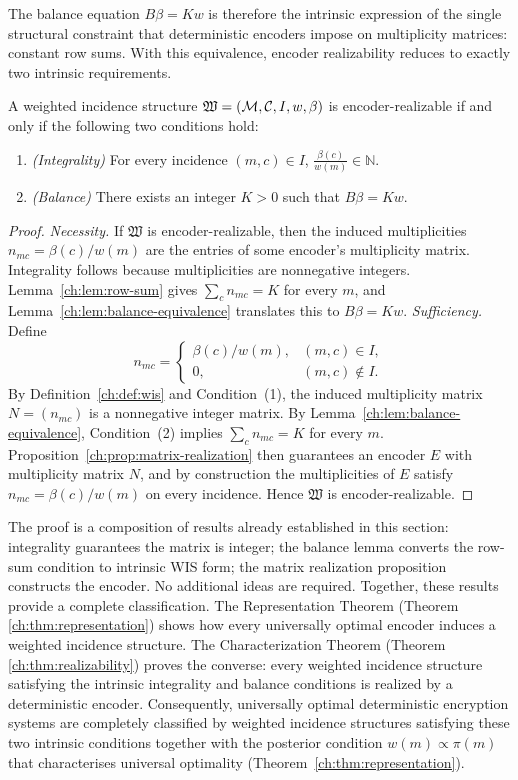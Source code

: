 The balance equation $B\beta=Kw$ is therefore the intrinsic expression
of the single structural constraint that deterministic encoders impose
on multiplicity matrices: constant row sums.  With this equivalence,
encoder realizability reduces to exactly two intrinsic requirements.
\begin{theorem}\label{ch:thm:realizability}
A weighted incidence structure $\mathfrak W=(\mathcal{M},\mathcal{C},I,w,\beta)$ is
encoder-realizable if and only if the following two conditions hold:
\begin{enumerate}
\item \emph{(Integrality)} For every incidence $(m,c)\in I$,
      $\frac{\beta(c)}{w(m)}\in\mathbb N.$
\item \emph{(Balance)} There exists an integer $K>0$ such that
      $B\beta = K w.$
\end{enumerate}
\end{theorem}
\begin{proof}
\emph{Necessity.}  If $\mathfrak W$ is encoder-realizable, then the
induced multiplicities $n_{mc}=\beta(c)/w(m)$ are the entries of some
encoder's multiplicity matrix.  Integrality follows because
multiplicities are nonnegative integers.  Lemma~\ref{ch:lem:row-sum}
gives $\sum_c n_{mc}=K$ for every $m$, and Lemma~\ref{ch:lem:balance-equivalence}
translates this to $B\beta=K w$.
\emph{Sufficiency.}  Define
\[
n_{mc}=
\begin{cases}
\beta(c)/w(m), & (m,c)\in I,\\
0, & (m,c)\notin I.
\end{cases}
\]
By Definition~\ref{ch:def:wis} and Condition~(1), the induced multiplicity
matrix $N=(n_{mc})$ is a nonnegative integer matrix.  By Lemma~\ref{ch:lem:balance-equivalence},
Condition~(2) implies $\sum_c n_{mc}=K$ for every $m$.  Proposition~\ref{ch:prop:matrix-realization}
then guarantees an encoder $E$ with multiplicity matrix $N$, and by
construction the multiplicities of $E$ satisfy $n_{mc}=\beta(c)/w(m)$ on
every incidence.  Hence $\mathfrak W$ is encoder-realizable.
\end{proof}

The proof is a composition of results already established in this
section: integrality guarantees the matrix is integer; the balance
lemma converts the row-sum condition to intrinsic WIS form; the matrix
realization proposition constructs the encoder.  No additional ideas
are required.
Together, these results provide a complete classification.
The Representation Theorem (Theorem~
\ref{ch:thm:representation}) shows
how every universally optimal encoder induces a weighted incidence
structure.  The Characterization Theorem (Theorem~
\ref{ch:thm:realizability})
proves the converse: every weighted incidence structure satisfying the
intrinsic integrality and balance conditions is realized by a
deterministic encoder.  Consequently, universally optimal deterministic
encryption systems are completely classified by weighted incidence
structures satisfying these two intrinsic conditions together with the
posterior condition \(w(m)\propto\pi(m)\) that characterises universal
optimality (Theorem~\ref{ch:thm:representation}).



